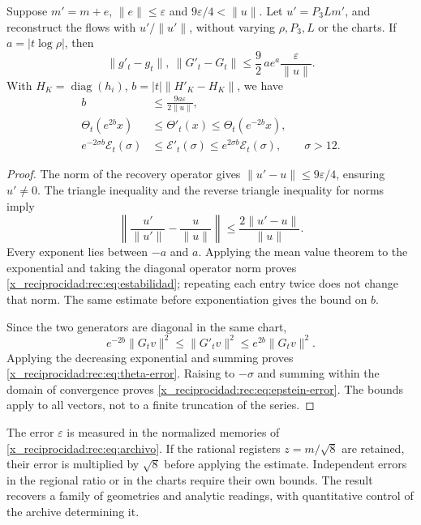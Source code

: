 \begin{theorem}
\label{x_reciprocidad:rec:thm:estabilidad}
Suppose \(m'=m+e\), \(\|e\|\le\varepsilon\) and \(9\varepsilon/4<\|u\|\). Let \(u'=P_3Lm'\), and reconstruct the flows with \(u'/\|u'\|\), without varying \(\rho,P_3,L\) or the charts. If \(a=|t\log\rho|\), then
\begin{equation}
 \|g'_t-g_t\|,\ \|G'_t-G_t\|
 \le\frac92\,a e^a\frac{\varepsilon}{\|u\|}.
 \label{x_reciprocidad:rec:eq:estabilidad}
\end{equation}
With \(H_K=\operatorname{diag}(h_i)\), \(b=|t|\|H'_K-H_K\|\), we have
\begin{align}
 b&\le\frac{9a\varepsilon}{2\|u\|},\nonumber\\
 \Theta_t(e^{2b}x)&\le\Theta'_t(x)\le\Theta_t(e^{-2b}x),\label{x_reciprocidad:rec:eq:theta-error}\\
 e^{-2\sigma b}\mathcal E_t(\sigma)&\le\mathcal E'_t(\sigma)
             \le e^{2\sigma b}\mathcal E_t(\sigma),\qquad\sigma>12.
 \label{x_reciprocidad:rec:eq:epstein-error}
\end{align}
\end{theorem}
\begin{proof}
The norm of the recovery operator gives \(\|u'-u\|\le9\varepsilon/4\), ensuring \(u'\ne0\). The triangle inequality and the reverse triangle inequality for norms imply
\[
 \left\|\frac{u'}{\|u'\|}-\frac{u}{\|u\|}\right\|
 \le\frac{2\|u'-u\|}{\|u\|}.
\]
Every exponent lies between \(-a\) and \(a\). Applying the mean value theorem to the exponential and taking the diagonal operator norm proves \eqref{x_reciprocidad:rec:eq:estabilidad}; repeating each entry twice does not change that norm. The same estimate before exponentiation gives the bound on \(b\).

Since the two generators are diagonal in the same chart,
\[
 e^{-2b}\|G_tv\|^2\le\|G'_tv\|^2\le e^{2b}\|G_tv\|^2.
\]
Applying the decreasing exponential and summing proves \eqref{x_reciprocidad:rec:eq:theta-error}. Raising to \(-\sigma\) and summing within the domain of convergence proves \eqref{x_reciprocidad:rec:eq:epstein-error}. The bounds apply to all vectors, not to a finite truncation of the series.
\end{proof}

The error \(\varepsilon\) is measured in the normalized memories of \eqref{x_reciprocidad:rec:eq:archivo}. If the rational registers \(z=m/\sqrt8\) are retained, their error is multiplied by \(\sqrt8\) before applying the estimate. Independent errors in the regional ratio or in the charts require their own bounds. The result recovers a family of geometries and analytic readings, with quantitative control of the archive determining it.
